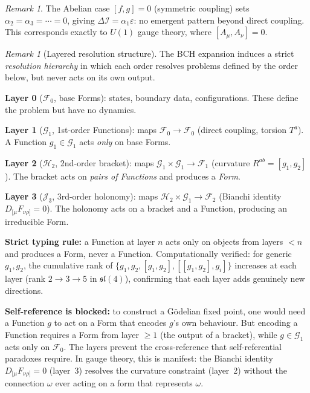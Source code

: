 \documentclass[12pt,a4paper]{article}
\theoremstyle{plain}
\theoremstyle{definition}
\theoremstyle{remark}
\newtheorem{remark}[theorem]{Remark}
\newcommand{\DI}{\Delta\mathcal{I}}
\newcommand{\eps}{\varepsilon}
\begin{document}
\begin{remark}
The Abelian case $[f,g] = 0$ (symmetric coupling) sets $\alpha_2 = \alpha_3 = \cdots = 0$, 
giving $\DI = \alpha_1 \eps$: no emergent pattern beyond direct coupling.
This corresponds exactly to $U(1)$ gauge theory, where $[A_\mu, A_\nu] = 0$.
\end{remark}

\begin{remark}[Layered resolution structure]\label{rem:layers}
The BCH expansion induces a strict \emph{resolution hierarchy} in which each
order resolves problems defined by the order below, but never acts on its
own output.

\medskip
\noindent\textbf{Layer 0} ($\mathcal{F}_0$, base Forms): states, boundary
data, configurations.  These define the problem but have no dynamics.

\noindent\textbf{Layer 1} ($\mathcal{G}_1$, 1st-order Functions):
maps $\mathcal{F}_0 \to \mathcal{F}_0$ (direct coupling, torsion $T^a$).
A Function $g_1 \in \mathcal{G}_1$ acts \emph{only} on base Forms.

\noindent\textbf{Layer 2} ($\mathcal{H}_2$, 2nd-order bracket):
maps $\mathcal{G}_1 \times \mathcal{G}_1 \to \mathcal{F}_1$
(curvature $R^{ab} = [g_1, g_2]$).
The bracket acts on \emph{pairs of Functions} and produces a \emph{Form}.

\noindent\textbf{Layer 3} ($\mathcal{J}_3$, 3rd-order holonomy):
maps $\mathcal{H}_2 \times \mathcal{G}_1 \to \mathcal{F}_2$
(Bianchi identity $D_{[\mu}F_{\nu\rho]} = 0$).
The holonomy acts on a bracket and a Function, producing an
irreducible Form.

\medskip
\noindent\textbf{Strict typing rule:} a Function at layer $n$ acts
only on objects from layers $< n$ and produces a Form, never a Function.
Computationally verified: for generic $g_1, g_2$, the cumulative rank
of $\{g_1, g_2, [g_1,g_2], [[g_1,g_2],g_i]\}$ increases at each layer
(rank $2 \to 3 \to 5$ in $\mathfrak{sl}(4)$), confirming that each
layer adds genuinely new directions.

\medskip
\noindent\textbf{Self-reference is blocked:}
to construct a G\"{o}delian fixed point, one would need a Function
$g$ to act on a Form that encodes $g$'s own behaviour.
But encoding a Function requires a Form from layer $\geq 1$
(the output of a bracket), while $g \in \mathcal{G}_1$ acts only on
$\mathcal{F}_0$.  The layers prevent the cross-reference that
self-referential paradoxes require.  In gauge theory, this is
manifest: the Bianchi identity $D_{[\mu}F_{\nu\rho]} = 0$
(layer~3) resolves the curvature constraint (layer~2) without
the connection $\omega$ ever acting on a form that represents $\omega$.
\end{remark}
\end{document}
